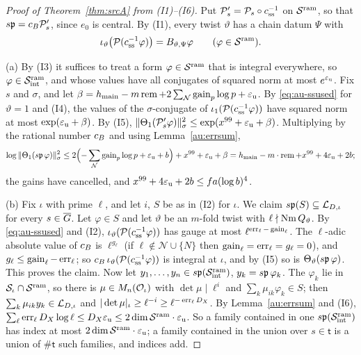 \documentclass[10pt]{amsart}
\theoremstyle{definition}
\theoremstyle{remark}
\begin{document}
\begin{proof}[Proof of Theorem~\ref{thm:srcA} from (I1)--(I6)]
Put $\mathcal P'_s=\mathcal P_s\circ c_{\mathrm{ss}}^{-1}$ on $\mathcal S^{\mathrm{ram}}$, so that $s\mathfrak p=c_B\mathcal P'_s$, since
$e_0$ is central. By (I1), every twist $\vartheta$ has a chain datum $\Psi$ with
\begin{equation}\label{eq:au-ssused}
\iota_\vartheta\bigl(\mathcal P(c_{\mathrm{ss}}^{-1}\varphi)\bigr)=B_{\vartheta,\Psi}\varphi\qquad
(\varphi\in\mathcal S^{\mathrm{ram}}).
\end{equation}

(a) By (I3) it suffices to treat a form $\varphi\in\mathcal S^{\mathrm{ram}}$ that is integral everywhere, so
$\varphi\in\mathcal S^{\mathrm{ram}}_{\mathrm{int}}$, and whose values have all conjugates of squared norm at most
$e^{\varepsilon_{\mathrm u}}$. Fix $s$ and $\sigma$, and let $\beta=h_{\mathrm{main}}-m\operatorname{rem}+2\sum_{\mathcal N}\operatorname{gain}_p
\log p+\varepsilon_{\mathrm u}$. By \eqref{eq:au-ssused} for $\vartheta=1$ and (I4), the values of the
$\sigma$-conjugate of $\iota_1(\mathcal P(c_{\mathrm{ss}}^{-1}\varphi))$ have squared norm at most
$\exp(\varepsilon_{\mathrm u}+\beta)$. By (I5), $\|\Theta_1(\mathcal P'_s\varphi)\|_\sigma^2\le\exp(x^{99}+\varepsilon_{\mathrm u}+\beta)$.
Multiplying by the rational number $c_B$ and using Lemma~\ref{au:errsum},
\[
\log\|\Theta_1(s\mathfrak p\,\varphi)\|_\sigma^2\le2\Bigl(-\sum_{\mathcal N}\operatorname{gain}_p\log p+\varepsilon_{\mathrm u}+b
\Bigr)+x^{99}+\varepsilon_{\mathrm u}+\beta=h_{\mathrm{main}}-m\cdot\operatorname{rem}+x^{99}+4\varepsilon_{\mathrm u}+2b ;
\]
the gains have cancelled, and $x^{99}+4\varepsilon_{\mathrm u}+2b\le fa(\log b)^4$.

(b) Fix $\iota$ with prime $\ell$, and let $i$, $S$ be as in (I2) for $\iota$. We claim
$s\mathfrak p(S)\subseteq\mathcal L_{D,\iota}$ for every $s\in\overline G$. Let $\varphi\in S$ and let $\vartheta$
be an $m$-fold twist with $\ell\nmid\operatorname{Nm} Q_\vartheta$. By \eqref{eq:au-ssused} and (I2),
$\iota_\vartheta(\mathcal P(c_{\mathrm{ss}}^{-1}\varphi))$ has gauge at most
$\ell^{\operatorname{err}_\ell-\operatorname{gain}_\ell}$. The $\ell$-adic absolute value of $c_B$ is $\ell^{g_\ell}$
(if $\ell\notin\mathcal N\cup\{N\}$ then $\operatorname{gain}_\ell=\operatorname{err}_\ell=g_\ell=0$), and
$g_\ell\le\operatorname{gain}_\ell-\operatorname{err}_\ell$; so $c_B\,\iota_\vartheta(\mathcal P(c_{\mathrm{ss}}^{-1}\varphi))$
is integral at $\iota$, and by (I5) so is $\Theta_\vartheta(s\mathfrak p\,\varphi)$. This proves the
claim. Now let $y_1,\dots,y_n\in s\mathfrak p(\mathcal S^{\mathrm{ram}}_{\mathrm{int}})$, $y_k=s\mathfrak p\,\varphi_k$. The
$\varphi_k$ lie in $\mathcal S_\iota\cap\mathcal S^{\mathrm{ram}}$, so there is $\mu\in M_n(\mathcal O_\iota)$ with
$\det\mu\mid\ell^i$ and $\sum_k\mu_{ik}\varphi_k\in S$; then $\sum_k\mu_{ik}y_k\in\mathcal L_{D,\iota}$
and $|\det\mu|_\iota\ge\ell^{-i}\ge\ell^{-\operatorname{err}_\ell D_X}$. By Lemma~\ref{au:errsum} and (I6),
$\sum_\ell\operatorname{err}_\ell D_X\log\ell\le D_X\varepsilon_{\mathrm u}\le2\dim\mathcal S^{\mathrm{ram}}\cdot\varepsilon_{\mathrm u}$. So a family contained
in one $s\mathfrak p(\mathcal S^{\mathrm{ram}}_{\mathrm{int}})$ has index at most $2\dim\mathcal S^{\mathrm{ram}}\cdot\varepsilon_{\mathrm u}$; a family
contained in the union over $s\in\mathsf t$ is a union of $\#\mathsf t$ such families, and indices
add.
\end{proof}
\end{document}
